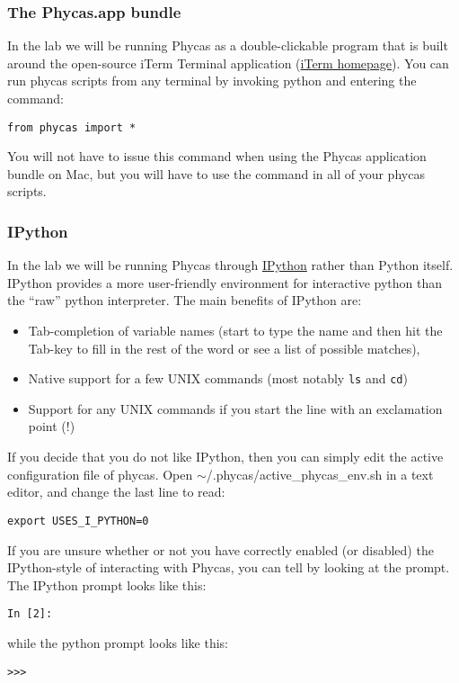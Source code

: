 \documentclass{article}
\newcommand{\cmd}[1]{\texttt{#1}\xspace}
\newcommand{\phycas}{Phycas\xspace}
\newcommand{\localfile}[1]{\textsf{#1}\xspace}
\begin{document}
\subsubsection{The Phycas.app bundle}
In the lab we will be running \phycas as a double-clickable program that is built around the open-source iTerm Terminal application (\href{http://iterm.sourceforge.net/}{iTerm homepage}).
You can run phycas scripts from any terminal by invoking python and entering the command:
\begin{verbatim}
from phycas import *
\end{verbatim}
You will not have to issue this command when using the \phycas application bundle on Mac, but you will have to use the command in all of your phycas scripts.
\subsubsection{IPython}
In the lab we will be running \phycas through \href{http://ipython.scipy.org/moin/}{IPython} rather than Python itself.  
IPython provides a more user-friendly environment for interactive python than the ``raw'' python interpreter.
The main benefits of IPython are:
\begin{itemize}
	\item Tab-completion of variable names (start to type the name and then hit the Tab-key to fill in the rest of the word or see a list of possible matches),
	\item Native support for a few UNIX commands (most notably \cmd{ls} and \cmd{cd})
	\item Support for any UNIX commands if you start the line with an exclamation point (!)
\end{itemize}
If you decide that you do not like IPython, then you can simply edit the active configuration file of phycas. 
Open 
\localfile{$\sim$/.phycas/active\_phycas\_env.sh} 
in a text editor, and change the last line to read:
\begin{verbatim}
export USES_I_PYTHON=0
\end{verbatim}

If you are unsure whether or not you have correctly enabled (or disabled) the IPython-style of interacting with \phycas, you can tell by looking at the prompt.
The IPython prompt looks like this:
\begin{verbatim}
In [2]: 
\end{verbatim}
while the python prompt looks like this:
\begin{verbatim}
>>>
\end{verbatim}
\end{document}
